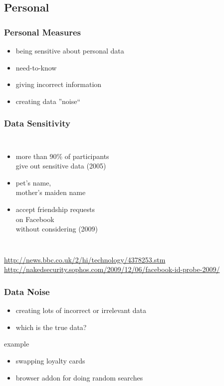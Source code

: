 \documentclass[dvipsnames]{beamer}
\theoremstyle{plain}
\begin{document}
\subsection{Personal}

\begin{frame}
  \frametitle{Personal Measures}

  \begin{itemize}
    \item being sensitive about personal data
    \item need-to-know

    \pause
    \bigskip
    \item giving incorrect information
    \item creating data ''noise``
  \end{itemize}
\end{frame}

\begin{frame}
  \frametitle{Data Sensitivity}

  \begin{columns}

    \begin{itemize}
      \item more than 90\% of participants\\
        give out sensitive data (2005)
      \item pet's name,\\
        mother's maiden name

      \bigskip
      \item accept friendship requests\\
        on Facebook\\
        without considering (2009)
    \end{itemize}
  \end{columns}

  \medskip
  \tiny{\url{http://news.bbc.co.uk/2/hi/technology/4378253.stm}}\\
  \smallskip
  \tiny{\url{http://nakedsecurity.sophos.com/2009/12/06/facebook-id-probe-2009/}}\\
\end{frame}

\begin{frame}
  \frametitle{Data Noise}

  \begin{itemize}
    \item creating lots of incorrect or irrelevant data
    \item which is the true data?
  \end{itemize}

  \begin{exampleblock}{example}
    \begin{itemize}
      \item swapping loyalty cards
      \item browser addon for doing random searches
    \end{itemize}
  \end{exampleblock}
\end{frame}
\end{document}
